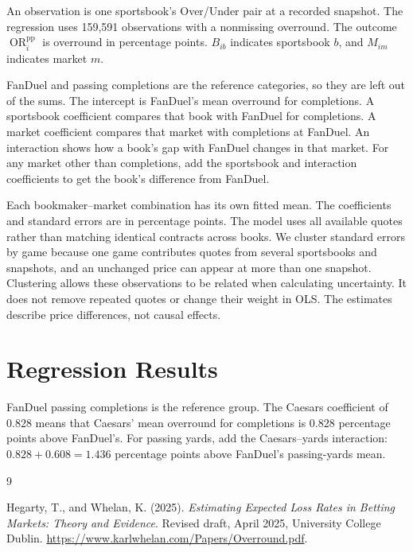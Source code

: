 \documentclass[11pt]{article}
\begin{document}
An observation is one sportsbook's Over/Under pair at a recorded
snapshot. The regression uses 159,591 observations with a nonmissing
overround. The outcome $\operatorname{OR}^{\mathrm{pp}}_{i}$ is overround in
percentage points. $B_{ib}$ indicates sportsbook $b$, and $M_{im}$
indicates market $m$.

FanDuel and passing completions are the reference categories, so they
are left out of the sums. The intercept is FanDuel's mean overround for
completions. A sportsbook coefficient compares that book with FanDuel
for completions. A market coefficient compares that market with
completions at FanDuel. An interaction shows how a book's gap with
FanDuel changes in that market. For any market other than completions,
add the sportsbook and interaction coefficients to get the book's
difference from FanDuel.

Each bookmaker--market combination has its own fitted mean. The
coefficients and standard errors are in percentage points. The model
uses all available quotes rather than matching identical contracts
across books. We cluster standard errors by game because one game
contributes quotes from several sportsbooks and snapshots, and an
unchanged price can appear at more than one snapshot. Clustering allows
these observations to be related when calculating uncertainty. It
does not remove repeated quotes or change their weight in OLS. The
estimates describe price differences, not causal effects.

\clearpage
\section{Regression Results}
FanDuel passing completions is the reference group. The Caesars
coefficient of $0.828$ means that Caesars' mean overround for
completions is $0.828$ percentage points above FanDuel's. For passing
yards, add the Caesars--yards interaction: $0.828+0.608=1.436$
percentage points above FanDuel's passing-yards mean.



\begin{thebibliography}{9}

Hegarty, T., and Whelan, K. (2025).
\textit{Estimating Expected Loss Rates in Betting Markets:
Theory and Evidence}.
Revised draft, April 2025, University College Dublin.
\url{https://www.karlwhelan.com/Papers/Overround.pdf}.

\end{thebibliography}
\end{document}

